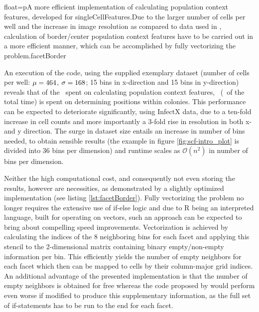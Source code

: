 \begin{rlisting}{float=p}{A more efficient implementation of calculating population context features, developed for singleCellFeatures.}{Due to the larger number of cells per well and the increase in image resolution as compared to data used in \citet{Knapp2011}, calculation of border/center population context features have to be carried out in a more efficient manner, which can be accomplished by fully vectorizing the problem.}{facetBorder}

\end{rlisting}


An execution of the code, using the supplied exemplary dataset (number of cells per well: $\mu=464$, $\sigma=168$; 15 bins in x-direction and 15 bins in y-direction) reveals that of the \knitrScfRnaicellTotal\ spent on calculating population context features, \knitrScfRnaicellEdgepos\ (\knitrScfRnaicellPercentage\ of the total time) is spent on determining positions within colonies. This performance can be expected to deteriorate significantly, using InfectX data, due to a ten-fold increase in cell counts and more importantly a 3-fold rise in resolution in both x- and y direction. The surge in dataset size entails an increase in number of bins needed, to obtain sensible results (the example in figure \ref{fig:scf-intro_plot} is divided into 36 bins per dimension) and runtime scales as $\mathcal{O}(n^2)$ in number of bins per dimension.

Neither the high computational cost, and consequently not even storing the results, however are necessities, as demonstrated by a slightly optimized implementation (see listing \ref{lst:facetBorder}). Fully vectorizing the problem no longer requires the extensive use of if-else logic and due to R being an interpreted language, built for operating on vectors, such an approach can be expected to bring about compelling speed improvements. Vectorization is achieved by calculating the indices of the 8 neighboring bins for each facet and applying this stencil to the 2-dimensional matrix containing binary empty/non-empty information per bin. This efficiently yields the number of empty neighbors for each facet which then can be mapped to cells by their column-major grid indices. An additional advantage of the presented implementation is that the number of empty neighbors is obtained for free whereas the code proposed by \citeauthor{Knapp2011} would perform even worse if modified to produce this supplementary information, as the full set of if-statements has to be run to the end for each facet.

